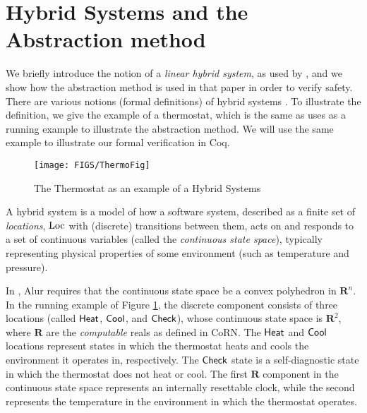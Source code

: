 \documentclass[runningheads]{llncs}
\newcommand{\IR}{{\mathbf R}}
\newcommand{\Heat}{{\sf Heat}}
\newcommand{\Cool}{{\sf Cool}}
\newcommand{\Chec}{{\sf Check}}
\newcommand{\Loc}{{\rm Loc}}
\begin{document}
\section{Hybrid Systems and the Abstraction method}
\label{sec:hybsys}
We briefly introduce the notion of a {\em linear hybrid system}, as
used by \cite{alur}, and we show how the abstraction method is used in
that paper in order to verify safety. There are various notions
(formal definitions) of hybrid systems
\cite{henziger,lynchvaandrager}. To illustrate the definition, we give
the example of a thermostat, which is the same as \cite{alur} uses as
a running example to illustrate the abstraction method. We will use
the same example to illustrate our formal verification in Coq.

\begin{center}
\begin{figure}[htb!]
\begin{center}
    \texttt{[image: FIGS/ThermoFig]}
\end{center}
\caption{The Thermostat as an example of a Hybrid Systems \label{fig:thermostat}}
\end{figure}
\end{center}

A hybrid system is a model of how a software system, described as a
finite set of \emph{locations}, $\Loc$ 
with (discrete) transitions between them, acts
on and responds to a set of continuous variables (called the
\emph{continuous state space}), typically representing physical
properties of some environment (such as temperature and pressure).

In \cite{alur}, Alur requires that the continuous state space be a
convex polyhedron in $\IR^ n$. 
In the running example of Figure \ref{fig:thermostat},
the discrete component consists of three locations (called $\Heat$, $\Cool$,
and $\Chec$), whose continuous state space is $\IR^2$,
where $\IR$ are the \emph{computable} reals as defined in CoRN. 
The $\Heat$ and $\Cool$ locations represent states in which the
thermostat heats and cools the environment it operates in,
respectively. The $\Chec$ state is a self-diagnostic state in which
the thermostat does not heat or cool. The first $\IR$ component in the
continuous state space represents an internally resettable clock,
while the second represents the temperature in the environment in
which the thermostat operates.
\end{document}

